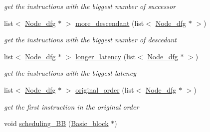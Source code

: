 \begin{DoxyCompactItemize}
\begin{DoxyCompactList}\small\item\em get the instructions with the biggest number of successor \item\end{DoxyCompactList}\item 
\hypertarget{classDfg_a2b62d89b71950a4da07369c4d9469050}{
list$<$ \hyperlink{classNode__dfg}{Node\_\-dfg} $\ast$ $>$ \hyperlink{classDfg_a2b62d89b71950a4da07369c4d9469050}{more\_\-descendant} (list$<$ \hyperlink{classNode__dfg}{Node\_\-dfg} $\ast$ $>$)}
\label{classDfg_a2b62d89b71950a4da07369c4d9469050}

\begin{DoxyCompactList}\small\item\em get the instructions with the biggest number of descedant \item\end{DoxyCompactList}\item 
\hypertarget{classDfg_ac5ef9b24f6fe84f73ffeb390fd514c03}{
list$<$ \hyperlink{classNode__dfg}{Node\_\-dfg} $\ast$ $>$ \hyperlink{classDfg_ac5ef9b24f6fe84f73ffeb390fd514c03}{longer\_\-latency} (list$<$ \hyperlink{classNode__dfg}{Node\_\-dfg} $\ast$ $>$)}
\label{classDfg_ac5ef9b24f6fe84f73ffeb390fd514c03}

\begin{DoxyCompactList}\small\item\em get the instructions with the biggest latency \item\end{DoxyCompactList}\item 
\hypertarget{classDfg_a0c8eff92703a7bdd07c7d13595685726}{
list$<$ \hyperlink{classNode__dfg}{Node\_\-dfg} $\ast$ $>$ \hyperlink{classDfg_a0c8eff92703a7bdd07c7d13595685726}{original\_\-order} (list$<$ \hyperlink{classNode__dfg}{Node\_\-dfg} $\ast$ $>$)}
\label{classDfg_a0c8eff92703a7bdd07c7d13595685726}

\begin{DoxyCompactList}\small\item\em get the first instruction in the original order \item\end{DoxyCompactList}\item 
\hypertarget{classDfg_a185255729c922752e1d6bcfdbc098461}{
void \hyperlink{classDfg_a185255729c922752e1d6bcfdbc098461}{scheduling\_\-BB} (\hyperlink{classBasic__block}{Basic\_\-block} $\ast$)}
\label{classDfg_a185255729c922752e1d6bcfdbc098461}


\end{DoxyCompactItemize}
